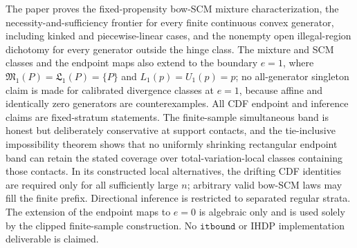 \documentclass{article}
\begin{document}
The paper proves the fixed-propensity bow-SCM mixture characterization, the necessity-and-sufficiency frontier for every finite continuous convex generator, including kinked and piecewise-linear cases, and the nonempty open illegal-region dichotomy for every generator outside the hinge class. The mixture and SCM classes and the endpoint maps also extend to the boundary \(e=1\), where \(\mathfrak M_1(P)=\mathfrak L_1(P)=\{P\}\) and \(L_1(p)=U_1(p)=p\); no all-generator singleton claim is made for calibrated divergence classes at \(e=1\), because affine and identically zero generators are counterexamples. All CDF endpoint and inference claims are fixed-stratum statements. The finite-sample simultaneous band is honest but deliberately conservative at support contacts, and the tie-inclusive impossibility theorem shows that no uniformly shrinking rectangular endpoint band can retain the stated coverage over total-variation-local classes containing those contacts. In its constructed local alternatives, the drifting CDF identities are required only for all sufficiently large \(n\); arbitrary valid bow-SCM laws may fill the finite prefix. Directional inference is restricted to separated regular strata. The extension of the endpoint maps to \(e=0\) is algebraic only and is used solely by the clipped finite-sample construction. No \(\texttt{itbound}\) or IHDP implementation deliverable is claimed.
\end{document}

